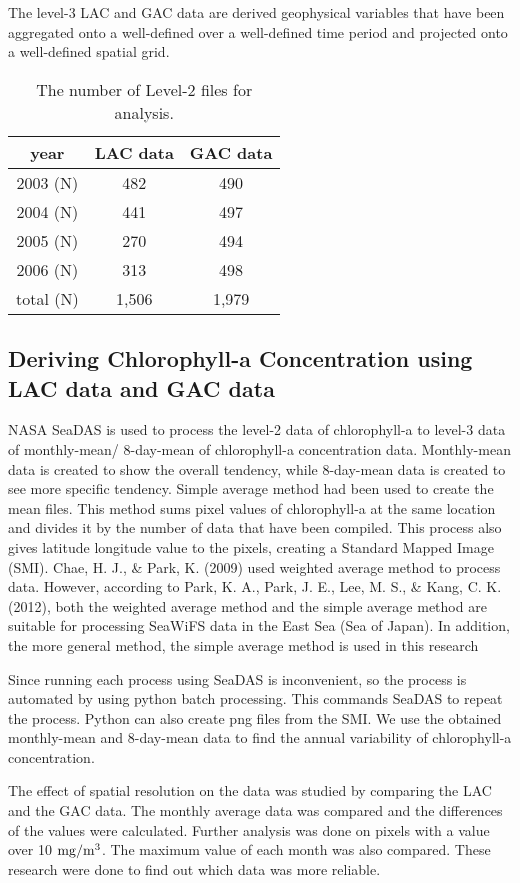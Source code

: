 The level-3 LAC and GAC data are derived geophysical variables that have been aggregated onto a well-defined over a well-defined time period and projected onto a well-defined spatial grid.

 \begin{table}[h]
	\centering
	\caption{The number of Level-2 files for analysis.}
	\label{data_information}
	\begin{tabular}{c  c  c  }
		\toprule
		year & LAC data  & GAC data \\ %
		\midrule
		2003 (N) & 482 & 490 \\ %
		2004 (N) & 441 & 497 \\ %
		2005 (N) & 270 & 494 \\ %
		2006 (N) & 313 & 498 \\ %
			\midrule
		total (N) & 1,506 & 1,979 \\ %
		\bottomrule
	\end{tabular}
\end{table}




\hfill \break


 \subsection{Deriving Chlorophyll-a Concentration using LAC data and GAC data}
 
NASA SeaDAS is used to process the level-2 data of chlorophyll-a to level-3 data of monthly-mean/ 8-day-mean of chlorophyll-a concentration data. Monthly-mean data is created to show the overall tendency, while 8-day-mean data is created to see more specific tendency. Simple average method had been used to create the mean files. This method sums pixel values of chlorophyll-a at the same location and divides it by the number of data that have been compiled. This process also gives latitude longitude value to the pixels, creating a Standard Mapped Image (SMI). Chae, H. J., \& Park, K. (2009) used weighted average method to process data. However, according to Park, K. A., Park, J. E., Lee, M. S., \& Kang, C. K. (2012), both the weighted average method and the simple average method are suitable for processing SeaWiFS data in the East Sea (Sea of Japan). In addition, the more general method, the simple average method is used in this research

Since running each process using SeaDAS is inconvenient, so the process is automated by using python batch processing. This commands SeaDAS to repeat the process. Python can also create png files from the SMI. We use the obtained monthly-mean and 8-day-mean data to find the annual variability of chlorophyll-a concentration.

The effect of spatial resolution on the data was studied by comparing the LAC and the GAC data. The monthly average data was compared and the differences of the values were calculated. Further analysis was done on pixels with a value over 10 $\rm mg/m^3$. The maximum value of each month was also compared. These research were done to find out which data was more reliable.